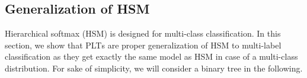 \documentclass{article}
\newcommand{\Algo}[1]{\textsc{#1}}
\newcommand{\sectionBefore}{-0pt}
\newcommand{\sectionAfter}{-0pt}
\begin{document}
\vspace{\sectionBefore}
\subsection{Generalization of HSM}
\label{sec:hsm}
\vspace{\sectionAfter}

Hierarchical softmax (\Algo{HSM}) is designed for multi-class classification. In this section, we show that \Algo{PLT}s are proper generalization of \Algo{HSM} to multi-label classification as they get exactly the same model as \Algo{HSM} in case of a multi-class distribution. 
For sake of simplicity, we will consider a binary tree in the following.  
\end{document}
